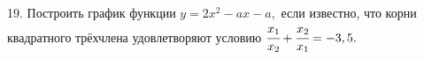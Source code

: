 19. Построить график функции $y=2x^2-ax-a,$ если известно, что корни квадратного трёхчлена удовлетворяют условию $\cfrac{x_1}{x_2}+\cfrac{x_2}{x_1}=-3,5.$\\
